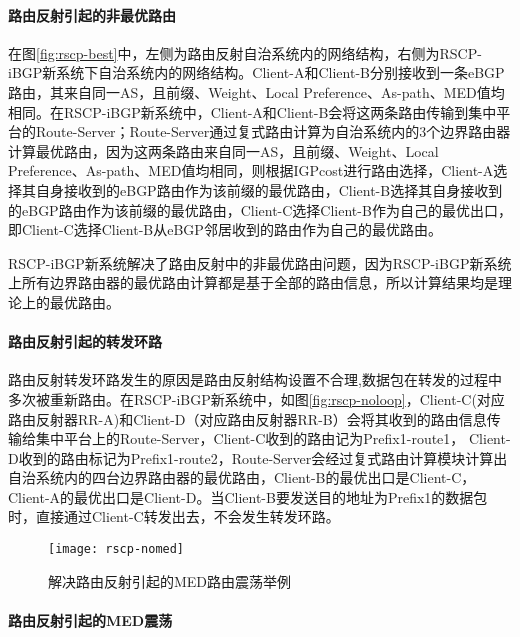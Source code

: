 \paragraph{路由反射引起的非最优路由}
在图\ref{fig:rscp-best}中，左侧为路由反射自治系统内的网络结构，右侧为RSCP-iBGP新系统下自治系统内的网络结构。Client-A和Client-B分别接收到一条eBGP路由，其来自同一AS，且前缀、Weight、Local Preference、As-path、MED值均相同。在RSCP-iBGP新系统中，Client-A和Client-B会将这两条路由传输到集中平台的Route-Server；Route-Server通过复式路由计算为自治系统内的3个边界路由器计算最优路由，因为这两条路由来自同一AS，且前缀、Weight、Local Preference、As-path、MED值均相同，则根据IGPcost进行路由选择，Client-A选择其自身接收到的eBGP路由作为该前缀的最优路由，Client-B选择其自身接收到的eBGP路由作为该前缀的最优路由，Client-C选择Client-B作为自己的最优出口，即Client-C选择Client-B从eBGP邻居收到的路由作为自己的最优路由。

RSCP-iBGP新系统解决了路由反射中的非最优路由问题，因为RSCP-iBGP新系统上所有边界路由器的最优路由计算都是基于全部的路由信息，所以计算结果均是理论上的最优路由。\\


\paragraph{路由反射引起的转发环路}

路由反射转发环路发生的原因是路由反射结构设置不合理,数据包在转发的过程中多次被重新路由。在RSCP-iBGP新系统中，如图\ref{fig:rscp-noloop}，Client-C(对应路由反射器RR-A)和Client-D（对应路由反射器RR-B）会将其收到的路由信息传输给集中平台上的Route-Server，Client-C收到的路由记为Prefix1-route1， Client-D收到的路由标记为Prefix1-route2，Route-Server会经过复式路由计算模块计算出自治系统内的四台边界路由器的最优路由，Client-B的最优出口是Client-C，Client-A的最优出口是Client-D。当Client-B要发送目的地址为Prefix1的数据包时，直接通过Client-C转发出去，不会发生转发环路。\\

\begin{figure}
  \centering
  \texttt{[image: rscp-nomed]}
  \caption{解决路由反射引起的MED路由震荡举例}
  \label{fig:rscp-nomed}
\end{figure}


\paragraph{路由反射引起的MED震荡}


